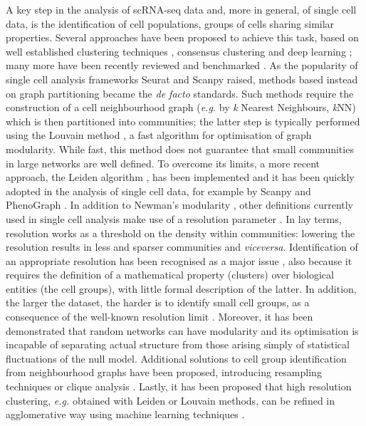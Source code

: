 \documentclass[10pt]{article}
\begin{document}
A key step in the analysis of scRNA-seq data and, more in general, of single cell data, is the identification of cell populations, groups of cells sharing similar properties. Several approaches have been proposed to achieve this task, based on well established clustering techniques \cite{wang_2017, lin_2017}, consensus clustering \cite{huh_2020, kiselev_2017} and deep learning \cite{li_2020}; many more have been recently reviewed \cite{krzak_2019, kiselev_2019} and benchmarked \cite{du_2018}. As the popularity of single cell analysis frameworks Seurat \cite{butler_2018} and Scanpy \cite{wolf_2018} raised, methods based instead on graph partitioning became the \emph{de facto} standards. Such methods require the construction of a cell neighbourhood graph (\emph{e.g.} by \emph{k }Nearest Neighbours, \emph{k}NN) which is then partitioned into communities; the latter step is typically performed using the Louvain method \cite{blondel_2008}, a fast algorithm for optimisation of graph modularity. While fast, this method does not guarantee that small communities in large networks are well defined. To overcome its limits, a more recent approach, the Leiden algorithm \cite{traag_2019}, has been implemented and it has been quickly adopted in the analysis of single cell data, for example by Scanpy and PhenoGraph \cite{levine_2015}. In addition to Newman's modularity \cite{newman_2004}, other definitions currently used in single cell analysis make use of a resolution parameter \cite{traag_2011, reichardt_2006} . In lay terms, resolution works as a threshold on the density within communities: lowering the resolution results in less and sparser communities and \emph{viceversa}. Identification of an appropriate resolution has been recognised as a major issue \cite{lhnemann_2020}, also because it requires the definition of a mathematical property (clusters) over biological entities (the cell groups), with little formal description of the latter. In addition, the larger the dataset, the harder is to identify small cell groups, as a consequence of the well-known resolution limit \cite{fortunato_2007}. Moreover, it has been demonstrated that random networks can have modularity \cite{guimer_2004} and its optimisation is incapable of separating actual structure from those arising simply of statistical fluctuations of the null model. Additional solutions to cell group identification from neighbourhood graphs have been proposed, introducing resampling techniques \cite{baran_2019} or clique analysis \cite{xu_2015}. Lastly, it has been proposed that high resolution clustering, \emph{e.g.} obtained with Leiden or Louvain methods, can be refined in agglomerative way using machine learning techniques \cite{miao_2020}.
\end{document}
